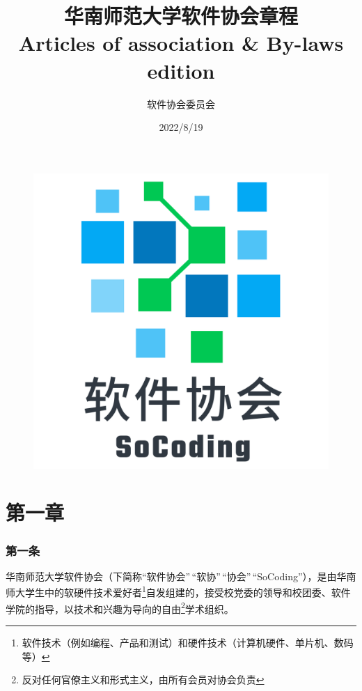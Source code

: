 \documentclass[
]{ctexart}
\author{软件协会委员会}
\date{2022/8/19}
\title{{\Huge{\textbf{华南师范大学软件协会章程}}}\\{\rm Articles of association \& By-laws \engordnumber{1} edition}}
\begin{document}
\begin{figure}[]
\centering
\includegraphics[scale=0.5]{images/logo.pdf}
\end{figure}

\maketitle

\newpage
\tableofcontents
\newpage

\hypertarget{ux7b2cux4e00ux7ae0-ux603bux5219}{%
\section{第一章}\label{ux7b2cux4e00ux7ae0-ux603bux5219}}

\hypertarget{ux7b2cux4e00ux6761-ux5173ux4e8eux534fux4f1a}{%
\subsubsection{第一条}\label{ux7b2cux4e00ux6761-ux5173ux4e8eux534fux4f1a}}

华南师范大学软件协会（下简称``软件协会''\,``软协''\,``协会''\,``SoCoding''），是由华南师大学生中的软硬件技术爱好者\footnote{软件技术（例如编程、产品和测试）和硬件技术（计算机硬件、单片机、数码等）}自发组建的，接受校党委的领导和校团委、软件学院的指导，以技术和兴趣为导向的自由\footnote{反对任何官僚主义和形式主义，由所有会员对协会负责}学术组织。
\end{document}
